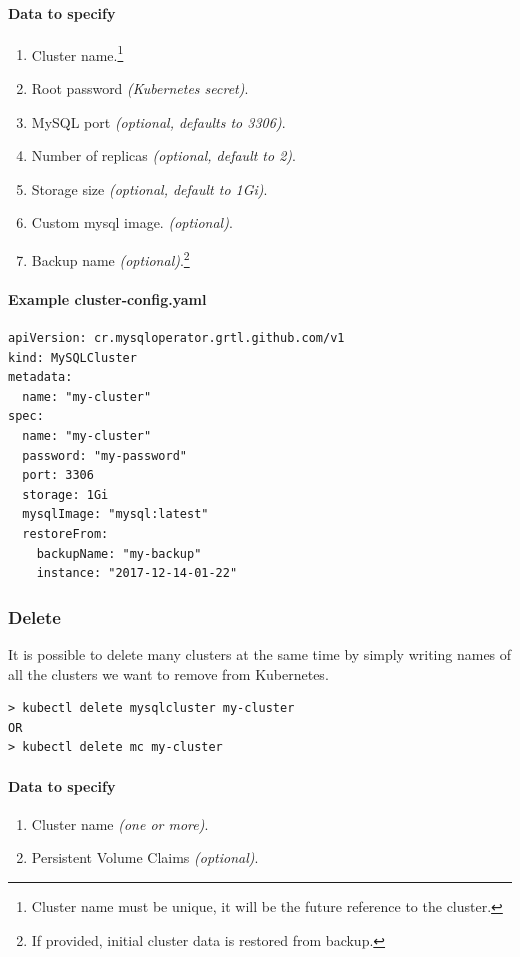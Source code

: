 \paragraph{Data to specify}
\begin{enumerate}
	\item Cluster name.\footnote{Cluster name must be unique, it will be the future reference
	to the cluster.}
	\item Root password \textit{(Kubernetes secret)}.
	\item MySQL port \textit{(optional, defaults to 3306)}.
	\item Number of replicas \textit{(optional, default to 2)}.
	\item Storage size \textit{(optional, default to 1Gi)}.
	\item Custom mysql image. \textit{(optional)}.
	\item Backup name \textit{(optional)}.\footnote{If provided, initial cluster data is restored
	from backup.}
\end{enumerate}

\paragraph{Example \textbf{cluster-config.yaml}}
\begin{lstlisting}[caption=cluster-config.yaml,captionpos=b]
apiVersion: cr.mysqloperator.grtl.github.com/v1
kind: MySQLCluster
metadata:
  name: "my-cluster"
spec:
  name: "my-cluster"
  password: "my-password"
  port: 3306
  storage: 1Gi
  mysqlImage: "mysql:latest"
  restoreFrom: 
	backupName: "my-backup"
	instance: "2017-12-14-01-22"
\end{lstlisting}

\subsubsection*{Delete}

It is possible to delete many clusters at the same time by simply writing
names of all the clusters we want to remove from Kubernetes.

\begin{lstlisting}
> kubectl delete mysqlcluster my-cluster
OR
> kubectl delete mc my-cluster
\end{lstlisting}

\paragraph{Data to specify}
\begin{enumerate}
	\item Cluster name \textit{(one or more)}.
	\item Persistent Volume Claims \textit{(optional)}.
\end{enumerate}

